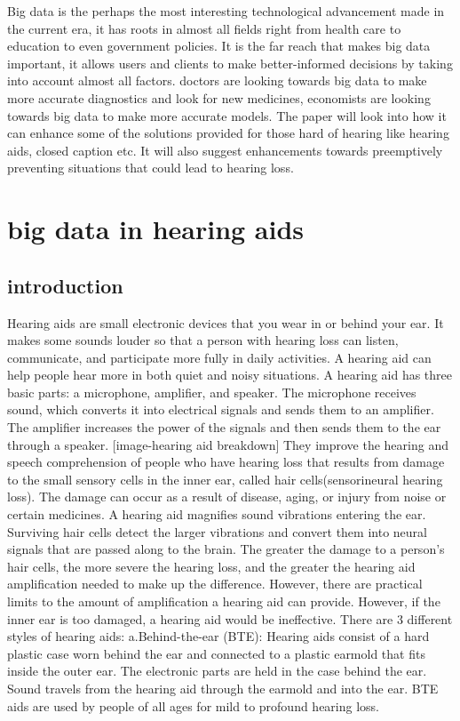 \documentclass[sigconf]{acmart}
\begin{document}
Big data is the perhaps the most interesting technological advancement made in the current era, it has roots in almost all fields right from health care to education to even government policies. It is the far reach that makes big data important, it allows users and clients to make better-informed decisions by taking into account almost all factors. doctors are looking towards big data to make more accurate diagnostics and look for new medicines, economists are looking towards big data to make more accurate models. The paper will look into how it can enhance some of the solutions provided for those hard of hearing like hearing aids, closed caption etc. It will also suggest enhancements towards preemptively preventing situations that could lead to hearing loss.

\section{big data in hearing aids}

\subsection{introduction}


Hearing aids are small electronic devices that you wear in or behind your ear. It makes some sounds louder so that a person with hearing loss can listen, communicate, and participate more fully in daily activities. A hearing aid can help people hear more in both quiet and noisy situations. A hearing aid has three basic parts: a microphone, amplifier, and speaker. The microphone receives sound, which converts it into electrical signals and sends them to an amplifier. The amplifier increases the power of the signals and then sends them to the ear through a speaker.
[image-hearing aid breakdown]
They improve the hearing and speech comprehension of people who have hearing loss that results from damage to the small sensory cells in the inner ear, called hair cells(sensorineural hearing loss). The damage can occur as a result of disease, aging, or injury from noise or certain medicines. A hearing aid magnifies sound vibrations entering the ear. Surviving hair cells detect the larger vibrations and convert them into neural signals that are passed along to the brain. The greater the damage to a person’s hair cells, the more severe the hearing loss, and the greater the hearing aid amplification needed to make up the difference. However, there are practical limits to the amount of amplification a hearing aid can provide. However, if the inner ear is too damaged, a hearing aid would be ineffective.
\newline
There are 3 different styles of hearing aids:
\newline
a.Behind-the-ear (BTE):
Hearing aids consist of a hard plastic case worn behind the ear and connected to a plastic earmold that fits inside the outer ear. The electronic parts are held in the case behind the ear. Sound travels from the hearing aid through the earmold and into the ear. BTE aids are used by people of all ages for mild to profound hearing loss.
\end{document}

